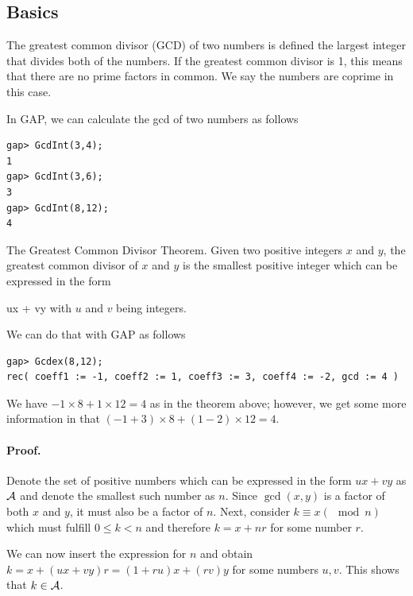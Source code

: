 
\subsection{Basics}

\begin{definition}
The greatest common divisor (GCD) of two numbers is defined the largest integer that divides both of the numbers. If the greatest common divisor is 1, this means that there are no prime factors in common. We say the numbers are coprime in this case.
\end{definition}

In GAP, we can calculate the gcd of two numbers as follows

\begin{verbatim}
gap> GcdInt(3,4);
1
gap> GcdInt(3,6);
3
gap> GcdInt(8,12);
4
\end{verbatim}

\begin{theorem}
The Greatest Common Divisor Theorem. Given two positive integers $x$ and $y$, the greatest common divisor of $x$ and $y$ is the smallest positive integer which can be expressed in the form

\bee
ux + vy
\eee
%
with $u$ and $v$ being integers.
\end{theorem}

We can do that with GAP as follows

\begin{verbatim}
gap> Gcdex(8,12);
rec( coeff1 := -1, coeff2 := 1, coeff3 := 3, coeff4 := -2, gcd := 4 )
\end{verbatim}

We have $-1 \times 8 + 1 \times 12 = 4$ as in the theorem above; however, we get some more information in that $(-1 + 3) \times 8 + (1 - 2) \times 12 = 4$.

\paragraph{Proof.} Denote the set of positive numbers which can be expressed in the form $ux + vy$ as $\mathcal{A}$ and denote the smallest such number as $n$. Since $\gcd(x,y)$ is a factor of both $x$ and $y$, it must also be a factor of $n$. Next, consider $k \equiv x (\mod n)$ which must fulfill $0 \leq k < n$ and therefore $k = x + nr$ for some number $r$. 

We can now insert the expression for $n$ and obtain $k = x + (ux + vy)r = (1+ru)x + (rv)y$ for some numbers $u, v$. This shows that $k \in \mathcal{A}$. 

